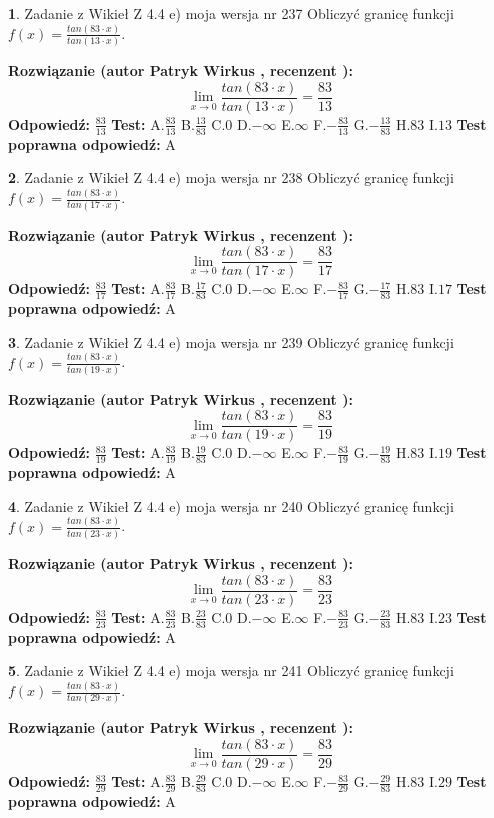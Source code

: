 \documentclass[12pt, a4paper]{article}
\theoremstyle{definition} %
\newtheorem{zad}{}
\newcommand{\zadStart}[1]{\begin{zad}#1\newline}
\newcommand{\zadStop}{\end{zad}}
\newcommand{\rozwStart}[2]{\noindent \textbf{Rozwiązanie (autor #1 , recenzent #2): }\newline}
\newcommand{\rozwStop}{\newline}
\newcommand{\odpStart}{\noindent \textbf{Odpowiedź:}\newline}
\newcommand{\odpStop}{\newline}
\newcommand{\testStart}{\noindent \textbf{Test:}\newline}
\newcommand{\testStop}{\newline}
\newcommand{\kluczStart}{\noindent \textbf{Test poprawna odpowiedź:}\newline}
\newcommand{\kluczStop}{\newline}
\begin{document}
\zadStart{Zadanie z Wikieł Z 4.4 e) moja wersja nr 237}
Obliczyć granicę funkcji $f(x)=\frac{tan(83\cdot x)}{tan(13\cdot x)}$.
\zadStop
\rozwStart{Patryk Wirkus}{}
$$\lim\limits_{x\to 0}\frac{tan(83\cdot x)}{tan(13\cdot x)}=
\frac{83}{13}$$
\rozwStop
\odpStart
$\frac{83}{13}$
\odpStop
\testStart
A.$\frac{83}{13}$
B.$\frac{13}{83}$
C.$0$
D.$-\infty$
E.$\infty$
F.$-\frac{83}{13}$
G.$-\frac{13}{83}$
H.$83$
I.$13$
\testStop
\kluczStart
A
\kluczStop



\zadStart{Zadanie z Wikieł Z 4.4 e) moja wersja nr 238}
Obliczyć granicę funkcji $f(x)=\frac{tan(83\cdot x)}{tan(17\cdot x)}$.
\zadStop
\rozwStart{Patryk Wirkus}{}
$$\lim\limits_{x\to 0}\frac{tan(83\cdot x)}{tan(17\cdot x)}=
\frac{83}{17}$$
\rozwStop
\odpStart
$\frac{83}{17}$
\odpStop
\testStart
A.$\frac{83}{17}$
B.$\frac{17}{83}$
C.$0$
D.$-\infty$
E.$\infty$
F.$-\frac{83}{17}$
G.$-\frac{17}{83}$
H.$83$
I.$17$
\testStop
\kluczStart
A
\kluczStop



\zadStart{Zadanie z Wikieł Z 4.4 e) moja wersja nr 239}
Obliczyć granicę funkcji $f(x)=\frac{tan(83\cdot x)}{tan(19\cdot x)}$.
\zadStop
\rozwStart{Patryk Wirkus}{}
$$\lim\limits_{x\to 0}\frac{tan(83\cdot x)}{tan(19\cdot x)}=
\frac{83}{19}$$
\rozwStop
\odpStart
$\frac{83}{19}$
\odpStop
\testStart
A.$\frac{83}{19}$
B.$\frac{19}{83}$
C.$0$
D.$-\infty$
E.$\infty$
F.$-\frac{83}{19}$
G.$-\frac{19}{83}$
H.$83$
I.$19$
\testStop
\kluczStart
A
\kluczStop



\zadStart{Zadanie z Wikieł Z 4.4 e) moja wersja nr 240}
Obliczyć granicę funkcji $f(x)=\frac{tan(83\cdot x)}{tan(23\cdot x)}$.
\zadStop
\rozwStart{Patryk Wirkus}{}
$$\lim\limits_{x\to 0}\frac{tan(83\cdot x)}{tan(23\cdot x)}=
\frac{83}{23}$$
\rozwStop
\odpStart
$\frac{83}{23}$
\odpStop
\testStart
A.$\frac{83}{23}$
B.$\frac{23}{83}$
C.$0$
D.$-\infty$
E.$\infty$
F.$-\frac{83}{23}$
G.$-\frac{23}{83}$
H.$83$
I.$23$
\testStop
\kluczStart
A
\kluczStop



\zadStart{Zadanie z Wikieł Z 4.4 e) moja wersja nr 241}
Obliczyć granicę funkcji $f(x)=\frac{tan(83\cdot x)}{tan(29\cdot x)}$.
\zadStop
\rozwStart{Patryk Wirkus}{}
$$\lim\limits_{x\to 0}\frac{tan(83\cdot x)}{tan(29\cdot x)}=
\frac{83}{29}$$
\rozwStop
\odpStart
$\frac{83}{29}$
\odpStop
\testStart
A.$\frac{83}{29}$
B.$\frac{29}{83}$
C.$0$
D.$-\infty$
E.$\infty$
F.$-\frac{83}{29}$
G.$-\frac{29}{83}$
H.$83$
I.$29$
\testStop
\kluczStart
A
\kluczStop
\end{document}
